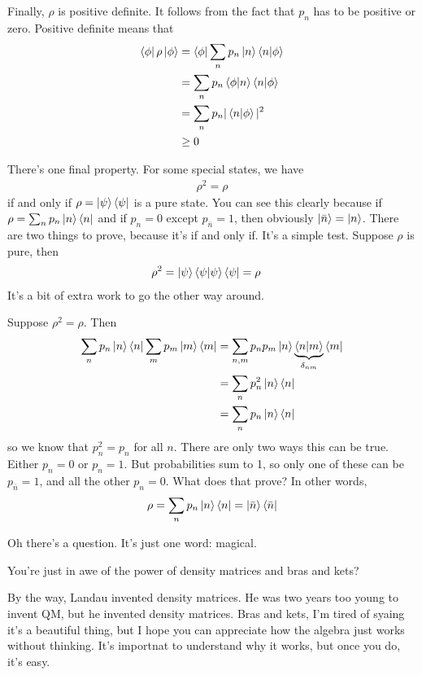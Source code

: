 Finally, $\rho$ is positive definite.
It follows from the fact that $p_n$ has to be positive or zero.
Positive definite means that
\begin{align}
    \bra{\phi}\rho\ket{\phi} &=
    \bra{\phi} \sum_n p_n\ket{n}\braket{n}{\phi}\\
    &=
    \sum_n p_n \braket{\phi}{n} \braket{n}{\phi}\\
    &= \sum_n p_n |\braket{n}{\phi}|^2\\
    &\ge 0
\end{align}

There's one final property.
For some special states, we have
\begin{align}
    \rho^2 = \rho
\end{align}
if and only if $\rho=\ket{\psi}\bra{\psi}$ is a pure state.
You can see this clearly because if
$\rho = \sum_n p_n \ket{n}\bra{n}$
and if $p_n=0$ except $p_{\bar{n}}=1$,
then obviously $\ket{\bar{n}}=\ket{n}$.
There are two things to prove,
because it's if and only if.
It's a simple test.
Suppose $\rho$ is pure,
then
\begin{align}
    \rho^2 &=
    \ket{\psi}\braket{\psi}{\psi}\bra{\psi} = \rho
\end{align}
It's a bit of extra work to go the other way around.

Suppose $\rho^2 = \rho$.
Then 
\begin{align}
    \sum_n p_n \ket{n}\bra{n}
    \sum_m p_m \ket{m}\bra{m}
    &= \sum_{n,m} p_n p_m \ket{n} 
    \underbrace{\braket{n}{m}}_{\delta_{nm}} \bra{m}\\
    &= \sum_n p_n^2 \ket{n}\bra{n}\\
    &= \sum_n p_n \ket{n}\bra{n}
\end{align}
so we know that $p_n^2=p_n$ for all $n$.
There are only two ways this can be true.
Either $p_n=0$ or $p_n=1$.
But probabilities sum to 1,
so only one of these can be $p_{\bar{n}}=1$,
and all the other $p_n=0$.
What does that prove?
In other words,
\begin{align}
    \rho = \sum_n p_n\ket{n}\bra{n} = \ket{\bar{n}}\bra{\bar{n}}
\end{align}

Oh there's a question.
It's just one word: magical.

You're just in awe of the power of density matrices and bras and kets?

By the way,
Landau invented density matrices.
He was two years too young to invent QM,
but he invented density matrices.
Bras and kets,
I'm tired of syaing it's a beautiful thing,
but I hope you can appreciate how the algebra just works without thinking.
It's importnat to understand why it works,
but once you do,
it's easy.

